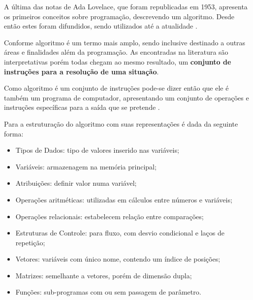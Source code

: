 A última das notas de Ada Lovelace, que foram republicadas em 1953\nocite{1253887}, apresenta os
primeiros conceitos sobre programação, descrevendo um algoritmo. Desde então
estes foram difundidos, sendo utilizados até a atualidade
\cite{santiago2003etal}.

Conforme  algoritmo é um termo mais amplo, sendo inclusive destinado a outras áreas e finalidades além da programação. As encontradas na literatura são interpretativas porém todas chegam ao mesmo resultado, um {\bfseries conjunto de instruções para a resolução de uma situação}.

Como algoritmo é um conjunto de instruções pode-se dizer então que ele é também um programa de computador, apresentando um conjunto de operações e instruções específicas para a saída que se pretende \cite{medina2006etal}.



Para  a estruturação do algoritmo com suas representações é dada da seguinte forma:

\begin{itemize}

\item Tipos de Dados: tipo de valores inserido nas variáveis;
\item Variáveis: armazenagem na memória principal;
\item Atribuições: definir valor numa variável;
\item Operações aritméticas: utilizadas em cálculos entre números e variáveis;
\item Operações relacionais: estabelecem relação entre comparações;
\item Estruturas de Controle: para fluxo, com desvio condicional e laços de repetição;
\item Vetores: variáveis com único nome, contendo um índice de posições;
\item Matrizes: semelhante a vetores, porém de dimensão dupla;
\item Funções: sub-programas com ou sem passagem de parâmetro.

\end{itemize}

